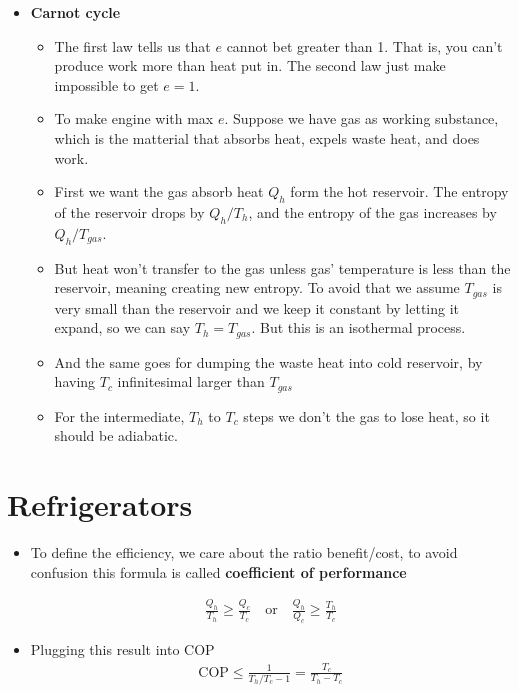 \documentclass{book}
\begin{document}
\begin{itemize}
	\item \textbf{Carnot cycle}
	      \begin{itemize}
		      \item The first law tells us that $e$ cannot bet greater than 1. That is, you can't produce work more than
		            heat put in. The second law just make impossible to get $ e=1 $.
		      \item To make engine with max $ e $. Suppose we have gas as working substance, which is the matterial
		            that absorbs heat, expels waste heat, and does work.
		      \item First we want the gas absorb heat $ Q_{h} $ form the hot reservoir. The entropy of the
		            reservoir drops by $ Q_{h} /T_{h}$, and the entropy of the gas increases by $ Q_{h}/T_{gas} $.
		      \item But heat won't transfer to the gas unless gas' temperature is less than the reservoir,
		            meaning creating new entropy. To avoid that we assume $ T_{gas} $ is very small than the reservoir
		            and we keep it constant by letting it expand, so we can say $ T_{h}= T_{gas} $. But this is an
		            isothermal process.
		      \item And the same goes for dumping the waste heat into cold reservoir, by having $ T_{c} $
		            infinitesimal larger than $ T_{gas} $
		      \item For the intermediate, $ T_{h} $ to $ T_{c} $ steps we don't the gas to lose heat,
		            so it should be adiabatic.
	      \end{itemize}
\end{itemize}


\section{Refrigerators}%
\label{sec:refrigerators}

\begin{itemize}
	\item To define the efficiency, we care about the ratio benefit/cost, to avoid confusion this formula
	      is called \textbf{coefficient of performance}

	      \begin{align}
		      \frac{Q_{h}}{T_{h}} \ge \frac{Q_{c}}{T_{c}} \quad \text{or} \quad
		      \frac{Q_{h}}{Q_{c}} \ge \frac{T_{h}}{T_{c}}
	      \end{align}
	\item  Plugging this result into COP
	      \begin{align}
		      \text{COP}  \le \frac{1}{T_{h}/T_{c} - 1} = \frac{T_{c}}{T_{h} - T_{c}}
	      \end{align}
\end{itemize}
\end{document}
